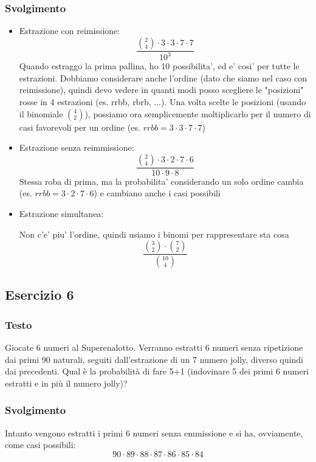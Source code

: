 \subsubsection{Svolgimento}
\begin{itemize}
\item Estrazione con reimissione:
  \[
    \frac{\binom{2}{4} \cdot 3 \cdot 3 \cdot 7 \cdot 7}{10^3}
  \]
    Quando estraggo la prima pallina, ho 10 possibilita', ed e' cosi' per tutte le estrazioni. Dobbiamo considerare anche l'ordine (dato che siamo nel caso con reimissione), quindi devo vedere in quanti modi posso scegliere le "posizioni" rosse in 4 estrazioni (es. rrbb, rbrb, ...). Una volta scelte le posizioni (usando il binomiale $ \binom{4}{2} $), possiamo ora semplicemente moltiplicarlo per il numero di casi favorevoli per un ordine (es. $ rrbb = 3 \cdot 3 \cdot 7 \cdot 7 $)
\item Estrazione senza reimmissione:
  \[
    \frac{\binom{2}{4} \cdot 3 \cdot 2 \cdot 7 \cdot 6}{10 \cdot 9 \cdot 8}
  \]
  Stessa roba di prima, ma la probabilita' considerando un solo ordine cambia (es. $ rrbb = 3\cdot 2 \cdot 7 \cdot 6 $) e cambiano anche i casi possibili
\item Estrazione simultanea:

  Non c'e' piu' l'ordine, quindi usiamo i binomi per rappresentare sta cosa
    \[
      \frac{\binom{3}{2} \cdot \binom{7}{2}}{\binom{10}{4}}
    \]
\end{itemize}

\subsection{Esercizio 6}

\subsubsection{Testo}
Giocate 6 numeri al Superenalotto. Verranno estratti 6 numeri senza ripetizione dai primi 90 naturali, seguiti dall'estrazione di un 7 numero jolly, diverso quindi dai precedenti. Qual è la probabilità di fare 5+1 (indovinare 5 dei primi 6 numeri estratti e in più il numero jolly)?

\subsubsection{Svolgimento}

Intanto vengono estratti i primi 6 numeri senza emmissione e si ha, ovviamente, come casi possibili:
\[
  90\cdot 89 \cdot 88 \cdot 87 \cdot 86 \cdot 85 \cdot 84
\]

